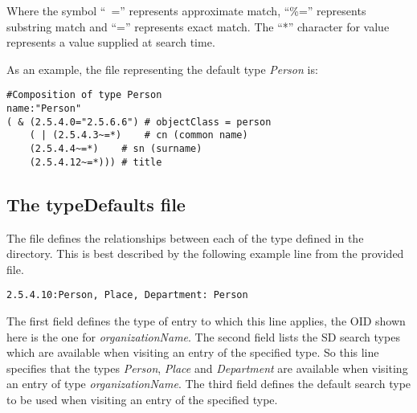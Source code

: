 Where the symbol ``~='' represents approximate match,
``\%='' represents substring match and ``='' represents exact match.
The ``*'' character for value represents a value supplied at search time.

As an example,
the file representing the default type {\em Person} is:

\begin{verbatim}
#Composition of type Person
name:"Person"
( & (2.5.4.0="2.5.6.6") # objectClass = person
    ( | (2.5.4.3~=*)	# cn (common name)
	(2.5.4.4~=*)	# sn (surname)
	(2.5.4.12~=*)))	# title
\end{verbatim}

\subsection {The typeDefaults file}

The  file defines the relationships between each of the
type defined in the  directory.
This is best described by the following example line from the provided
 file.
\begin{verbatim}
2.5.4.10:Person, Place, Department: Person
\end{verbatim}
The first field defines the type of entry to which this line applies,
the OID shown here is the one for {\em organizationName}.
The second field lists the SD search types which are available when visiting 
an entry of the specified type. 
So this line specifies that the types {\em Person},
{\em Place} and {\em Department} are available when visiting an entry of
type {\em organizationName}.
The third field defines the default search type to be used when visiting
an entry of the specified type.
